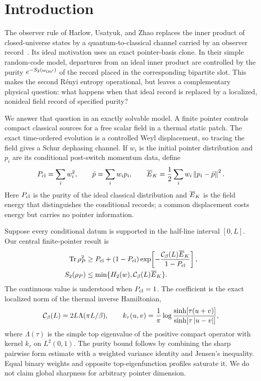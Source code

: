 \section{Introduction}
\label{sec:introduction}

The observer rule of Harlow, Usatyuk, and Zhao replaces the inner product of
closed-universe states by a quantum-to-classical channel carried by an
observer record~\cite{HarlowUsatyukZhao2025}.  Its ideal motivation uses an
exact pointer-basis clone.  In their simple random-code model, departures from
an ideal inner product are controlled by the purity
$e^{-S_2(\omega_{\rm Ob'})}$ of the record placed in the corresponding
bipartite slot.  This makes the second R\'enyi entropy operational, but leaves
a complementary physical question: what happens when that ideal record is
replaced by a localized, nonideal field record of specified purity?

We answer that question in an exactly solvable model.  A finite pointer
controls compact classical sources for a free scalar field in a thermal
static patch.  The exact time-ordered evolution is a controlled Weyl
displacement, so tracing the field gives a Schur dephasing channel.  If
$w_i$ is the initial pointer distribution and $p_i$ are its conditional
post-switch momentum data, define
\begin{equation}
 P_{\rm cl}=\sum_iw_i^2,
 \qquad
 \bar p=\sum_iw_ip_i,
 \qquad
 \overline E_{K}=\frac12\sum_iw_i\left\lVert p_i-\bar p\right\rVert^2.
 \label{eq:intro-centered-data}
\end{equation}
Here $P_{\rm cl}$ is the purity of the ideal classical distribution and $\overline E_{K}$ is
the field energy that distinguishes the conditional records; a common
displacement costs energy but carries no pointer information.

Suppose every conditional datum is supported in the half-line interval
$[0,L]$.  Our central finite-pointer result is
\begin{align}
 \operatorname{Tr}\rho_P^2
 &\geq P_{\rm cl}+(1-P_{\rm cl})
 \exp\!\left[-\frac{\mathcal C_\beta(L)\overline E_{K}}{1-P_{\rm cl}}\right],
 \label{eq:intro-purity-bound}\\
 S_2(\rho_P)
 &\leq\min\{H_2(w),\mathcal C_\beta(L)\overline E_{K}\}.
 \label{eq:intro-renyi-bound}
\end{align}
The continuous value is understood when $P_{\rm cl}=1$.  The coefficient is the
exact localized norm of the thermal inverse Hamiltonian,
\begin{equation}
 \mathcal C_\beta(L)=2L\Lambda(\pi L/\beta),
 \qquad
 k_\tau(u,v)=\frac1\pi
 \log\frac{\sinh[\tau(u+v)]}{\sinh[\tau\left\lvert u-v\right\rvert]},
 \label{eq:intro-kernel}
\end{equation}
where $\Lambda(\tau)$ is the simple top eigenvalue of the positive compact
operator with kernel $k_\tau$ on $L^2(0,1)$.  The purity bound follows by
combining the sharp pairwise form estimate with a weighted variance identity
and Jensen's inequality.  Equal binary weights and opposite top-eigenfunction
profiles saturate it.  We do not claim global sharpness for arbitrary pointer
dimension.

